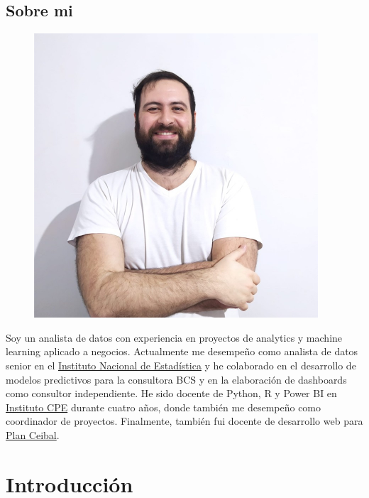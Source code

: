 \documentclass[
  letterpaper,
  DIV=11,
  numbers=noendperiod]{scrreprt}
\begin{document}
\hypertarget{sobre-mi}{%
\section*{Sobre mi}\label{sobre-mi}}

\begin{figure}

{\centering \includegraphics[width=4.16667in,height=\textheight]{./images/yo.jpg}

}

\end{figure}

Soy un analista de datos con experiencia en proyectos de analytics y
machine learning aplicado a negocios. Actualmente me desempeño como
analista de datos senior en el \href{https://www.ine.gub.uy/}{Instituto
Nacional de Estadística} y he colaborado en el desarrollo de modelos
predictivos para la consultora BCS y en la elaboración de dashboards
como consultor independiente. He sido docente de Python, R y Power BI en
\href{https://institutocpe.edu.uy/}{Instituto CPE} durante cuatro años,
donde también me desempeño como coordinador de proyectos. Finalmente,
también fui docente de desarrollo web para
\href{https://www.ceibal.edu.uy/es/jovenes-programar}{Plan Ceibal}.


\hypertarget{introducciuxf3n}{%
\chapter{Introducción}\label{introducciuxf3n}}
\end{document}
